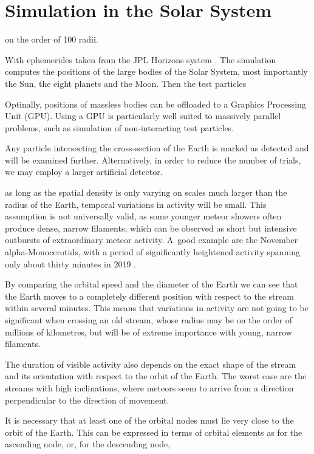 


\section{Simulation in the Solar System} \label{as}
    on the order of 100 radii.

    With ephemerides taken from the JPL Horizons system \citep{...}.
    The simulation computes the positions of the large bodies of the Solar System, most importantly the Sun,
    the eight planets and the Moon. Then the test particles

    Optinally, positions of massless bodies can be offloaded to a Graphics Processing Unit (GPU).
    Using a GPU is particularly well suited to massively parallel problems, such as simulation of non-interacting test particles.

    Any particle intersecting the cross-section of the Earth is marked as detected and will be examined further.
    Alternatively, in order to reduce the number of trials, we may employ a larger artificial detector.


    as long as the spatial density is only varying on scales much larger than the radius of the Earth,
    temporal variations in activity will be small.
    This assumption is not universally valid, as some younger meteor showers often produce dense, narrow filaments,
    which can be observed as short but intensive outbursts of extraordinary meteor activity.
    A~good example are the November alpha-Monocerotids, with a period of significantly
    heightened activity spanning only about thirty minutes in 2019 \citep{CBET4692}.

    By comparing the orbital speed and the diameter of the Earth we can see that the Earth moves
    to a completely different position with respect to the stream within several minutes.
    This means that variations in activity are not going to be significant when crossing an old stream,
    whose radius may be on the order of millions of kilometres, but will be of extreme importance with young, narrow filaments.

    The duration of visible activity also depends on the exact shape of the stream and its orientation with respect to the orbit of the Earth.
    The worst case are the streams with high inclinations, where meteors seem to arrive from a direction perpendicular
    to the direction of movement.



    It is necessary that at least one of the orbital nodes must lie very close to the orbit of the Earth.
    This can be expressed in terms of orbital elements as
    for the ascending node, or, for the descending node,

